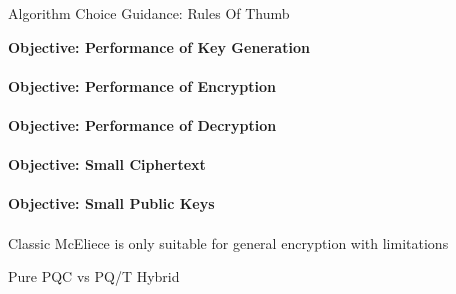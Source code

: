 \begin{minipage}[t]{0.7\textwidth}
\begin{algorithmbox}{Algorithm Choice Guidance: Rules Of Thumb \tbv}
\begin{minipage}[t]{0.5\textwidth}
            {\scriptsize \bfseries Objective: Performance of Key Generation}\\[0.1\baselineskip]
            \\[0.75\baselineskip]
            {\scriptsize \bfseries Objective: Performance of Encryption}\\[0.1\baselineskip]
            \\[0.75\baselineskip]
            {\scriptsize \bfseries Objective: Performance of Decryption}\\[0.1\baselineskip]
            \\[0.75\baselineskip]
            {\scriptsize \bfseries Objective: Small Ciphertext}\\[0.1\baselineskip]
            \\[0.75\baselineskip]
            {\scriptsize \bfseries Objective: Small Public Keys}\\[0.1\baselineskip]
            \\[0.75\baselineskip]
            {\tiny * Classic McEliece is only suitable for general encryption with limitations}\\[-0.5\baselineskip]
        \end{minipage}
    \end{algorithmbox}
    \vfill
    \begin{algorithmbox}{Pure PQC vs PQ/T Hybrid}
        \scriptsize

\end{algorithmbox}
\end{minipage}
